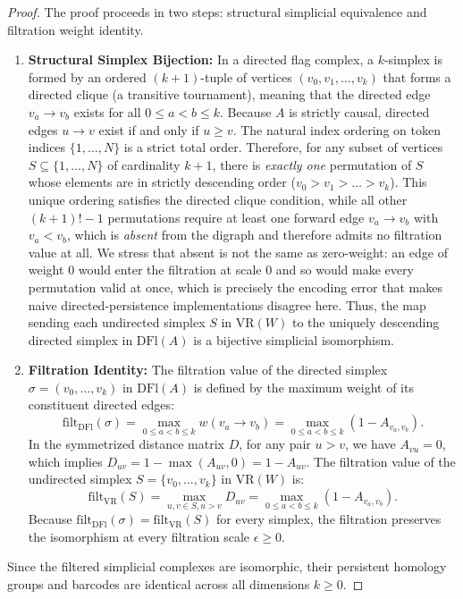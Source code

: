 \documentclass{article}
\begin{document}
\begin{proof}
The proof proceeds in two steps: structural simplicial equivalence and filtration weight identity.
\begin{enumerate}
    \item \textbf{Structural Simplex Bijection:} In a directed flag complex, a $k$-simplex is formed by an ordered $(k+1)$-tuple of vertices $(v_0, v_1, \dots, v_k)$ that forms a directed clique (a transitive tournament), meaning that the directed edge $v_a \to v_b$ exists for all $0 \le a < b \le k$. Because $A$ is strictly causal, directed edges $u \to v$ exist if and only if $u \ge v$. The natural index ordering on token indices $\{1, \dots, N\}$ is a strict total order. Therefore, for any subset of vertices $S \subseteq \{1, \dots, N\}$ of cardinality $k+1$, there is \emph{exactly one} permutation of $S$ whose elements are in strictly descending order ($v_0 > v_1 > \dots > v_k$). This unique ordering satisfies the directed clique condition, while all other $(k+1)! - 1$ permutations require at least one forward edge $v_a \to v_b$ with $v_a < v_b$, which is \emph{absent} from the digraph and therefore admits no filtration value at all. We stress that absent is not the same as zero-weight: an edge of weight $0$ would enter the filtration at scale $0$ and so would make every permutation valid at once, which is precisely the encoding error that makes naive directed-persistence implementations disagree here. Thus, the map sending each undirected simplex $S$ in $\mathrm{VR}(W)$ to the uniquely descending directed simplex in $\mathrm{DFl}(A)$ is a bijective simplicial isomorphism.
    \item \textbf{Filtration Identity:} The filtration value of the directed simplex $\sigma = (v_0, \dots, v_k)$ in $\mathrm{DFl}(A)$ is defined by the maximum weight of its constituent directed edges:
    \begin{equation}
    \mathrm{filt}_{\mathrm{DFl}}(\sigma) = \max_{0 \le a < b \le k} w(v_a \to v_b) = \max_{0 \le a < b \le k} (1 - A_{v_a, v_b}).
    \end{equation}
    In the symmetrized distance matrix $D$, for any pair $u > v$, we have $A_{vu} = 0$, which implies $D_{uv} = 1 - \max(A_{uv}, 0) = 1 - A_{uv}$. The filtration value of the undirected simplex $S = \{v_0, \dots, v_k\}$ in $\mathrm{VR}(W)$ is:
    \begin{equation}
    \mathrm{filt}_{\mathrm{VR}}(S) = \max_{u, v \in S, u > v} D_{uv} = \max_{0 \le a < b \le k} (1 - A_{v_a, v_b}).
    \end{equation}
    Because $\mathrm{filt}_{\mathrm{DFl}}(\sigma) = \mathrm{filt}_{\mathrm{VR}}(S)$ for every simplex, the filtration preserves the isomorphism at every filtration scale $\epsilon \ge 0$.
\end{enumerate}
Since the filtered simplicial complexes are isomorphic, their persistent homology groups and barcodes are identical across all dimensions $k \ge 0$.
\end{proof}
\end{document}
